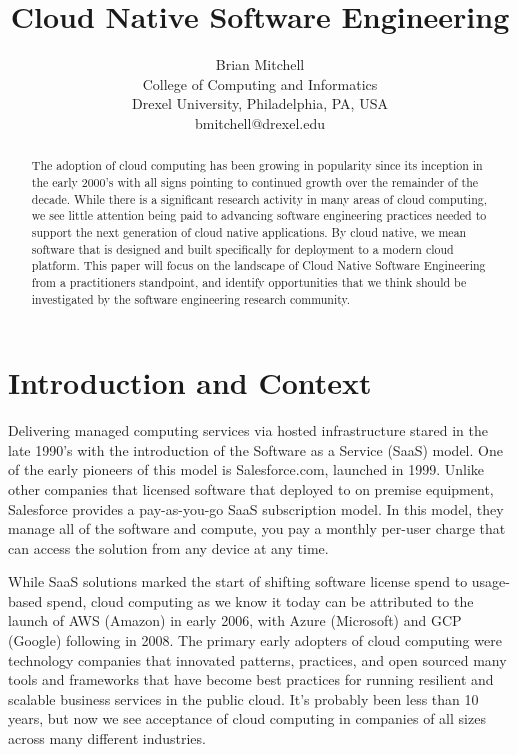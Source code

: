 \documentclass[conference]{IEEEconf}
\title{ 
        	Cloud Native Software Engineering 
      }
\author{
			Brian Mitchell\\
			College of Computing and Informatics\\
			Drexel University, Philadelphia, PA, USA\\
			bmitchell@drexel.edu
}
\date{}
\begin{document}
%

\maketitle

\thispagestyle{empty}


\begin{abstract}

The adoption of cloud computing has been growing in popularity since its inception in the early 2000's with all signs pointing to continued growth over the remainder of the decade\cite{IDCReport}. While there is a significant research activity in many areas of cloud computing, we see little attention being paid to advancing software engineering practices needed to support the next generation of cloud native applications.  By cloud native, we mean software that is designed and built specifically for deployment to a modern cloud platform. This paper will focus on the landscape of Cloud Native Software Engineering from a practitioners standpoint, and  identify opportunities that we think should be investigated by the software engineering research community.

\end{abstract}  



\section{Introduction and Context}
\label{Intro}
Delivering managed computing services via hosted infrastructure stared in the late 1990's with the introduction of the Software as a Service (SaaS) model. One of the early pioneers of this model is Salesforce.com, launched in 1999\cite{SalesforceHistory}.  Unlike other companies that licensed software that deployed to on premise equipment, Salesforce provides a pay-as-you-go SaaS subscription model. In this model, they manage all of the software and compute, you pay a monthly per-user charge that can access the solution from any device at any time.     

While SaaS solutions marked the start of shifting software license spend to usage-based spend, cloud computing as we know it today can be attributed to the launch of AWS (Amazon) \cite{AWSLaunch} in early 2006, with Azure (Microsoft)\cite{AzureLaunch} and GCP (Google)\cite{GCPLaunch} following in 2008. The primary early adopters of cloud computing were technology companies that innovated patterns, practices, and open sourced many tools and frameworks that have become best practices for running resilient and scalable business services in the public cloud.  It's probably been less than 10 years, but now we see acceptance of cloud computing in companies of all sizes across many different industries. 
\end{document}
